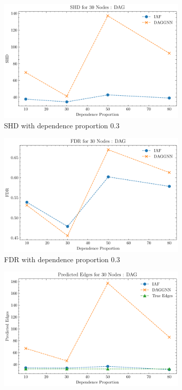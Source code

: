 \documentclass[10pt]{article}
\begin{document}
\begin{figure}[H]
    \centering
    \begin{subfigure}{0.45\textwidth}
        \includegraphics[width=\textwidth]{fig/SHD_dependence_30_DAG_threshold0.3.pdf}
        \caption{SHD with dependence proportion 0.3}
        \label{SHD_prop30}
    \end{subfigure}
    \hfill
    \begin{subfigure}{0.45\textwidth}
        \includegraphics[width=\textwidth]{fig/FDR_dependence_30_DAG_threshold0.3.pdf}
        \caption{FDR with dependence proportion 0.3}
        \label{FDR_prop30}
    \end{subfigure}
    \begin{subfigure}{0.45\textwidth}
        \includegraphics[width=\textwidth]{fig/Predicted Edges_dependence_30_DAG_threshold0.3.pdf}

\end{subfigure}
\end{figure}
\end{document}
